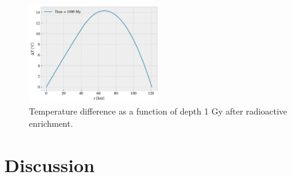 \documentclass[%
 reprint,
nofootinbib,
aps,
]{revtex4-1}
\begin{document}
\begin{figure}[H]
    \centering
    \includegraphics[width=0.5\textwidth]{figures/DeltaT_Last.pdf}
    \caption{Temperature difference as a function of depth 1 Gy after radioactive enrichment. }
    \label{fig:DeltaT_Last}
\end{figure}


\section{Discussion}
\end{document}
